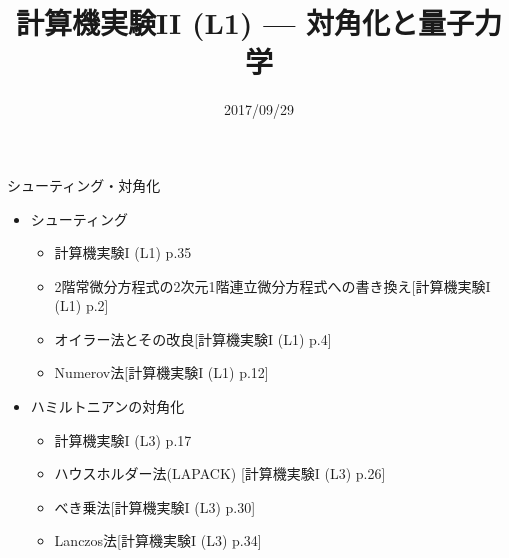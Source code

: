 \documentclass[dvipdfmx]{beamer}
\title{計算機実験II (L1) --- 対角化と量子力学}
\date{2017/09/29}
\begin{document}
\begin{frame}
  \titlepage
  \tableofcontents
\end{frame}




\begin{frame}[t,fragile]{シューティング・対角化}
  \begin{itemize}
    \setlength{\itemsep}{1em}
  \item シューティング
    \begin{itemize}
    \item 計算機実験I (L1) p.35
    \item 2階常微分方程式の2次元1階連立微分方程式への書き換え[計算機実験I (L1) p.2]
    \item オイラー法とその改良[計算機実験I (L1) p.4]
    \item Numerov法[計算機実験I (L1) p.12]
    \end{itemize}
  \item ハミルトニアンの対角化
    \begin{itemize}
    \item 計算機実験I (L3) p.17
    \item ハウスホルダー法(LAPACK) [計算機実験I (L3) p.26]
    \item べき乗法[計算機実験I (L3) p.30]
    \item Lanczos法[計算機実験I (L3) p.34]
    \end{itemize}
  \end{itemize}
\end{frame}


\end{document}
